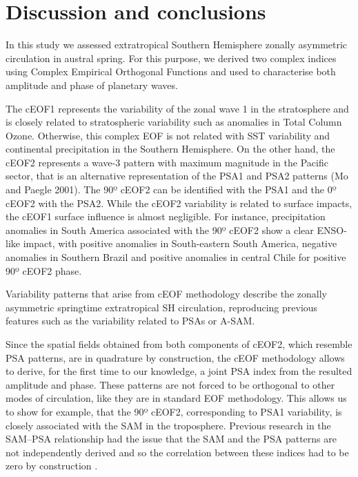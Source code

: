 \documentclass[pdflatex,lineno,sn-basic]{sn-jnl}
\theoremstyle{thmstyleone}%
\theoremstyle{thmstyletwo}%
\theoremstyle{thmstylethree}%
\begin{document}
\hypertarget{discussion}{%
\section{Discussion and conclusions}\label{discussion}}

In this study we assessed extratropical Southern Hemisphere zonally asymmetric circulation in austral spring.
For this purpose, we derived two complex indices using Complex Empirical Orthogonal Functions and used to characterise both amplitude and phase of planetary waves.

The cEOF1 represents the variability of the zonal wave 1 in the stratosphere and is closely related to stratospheric variability such as anomalies in Total Column Ozone.
Otherwise, this complex EOF is not related with SST variability and continental precipitation in the Southern Hemisphere.
On the other hand, the cEOF2 represents a wave-3 pattern with maximum magnitude in the Pacific sector, that is an alternative representation of the PSA1 and PSA2 patterns (Mo and Paegle 2001).
The 90º cEOF2 can be identified with the PSA1 and the 0º cEOF2 with the PSA2.
While the cEOF2 variability is related to surface impacts, the cEOF1 surface influence is almost negligible.
For instance, precipitation anomalies in South America associated with the 90º cEOF2 show a clear ENSO-like impact, with positive anomalies in South-eastern South America, negative anomalies in Southern Brazil and positive anomalies in central Chile for positive 90º cEOF2 phase.

Variability patterns that arise from cEOF methodology describe the zonally asymmetric springtime extratropical SH circulation, reproducing previous features such as the variability related to PSAs or A-SAM.

Since the spatial fields obtained from both components of cEOF2, which resemble PSA patterns, are in quadrature by construction, the cEOF methodology allows to derive, for the first time to our knowledge, a joint PSA index from the resulted amplitude and phase.
These patterns are not forced to be orthogonal to other modes of circulation, like they are in standard EOF methodology.
This allows us to show for example, that the 90º cEOF2, corresponding to PSA1 variability, is closely associated with the SAM in the troposphere.
Previous research in the SAM--PSA relationship had the issue that the SAM and the PSA patterns are not independently derived and so the correlation between these indices had to be zero by construction \citep[e.g.][]{yu2015}.
\end{document}

